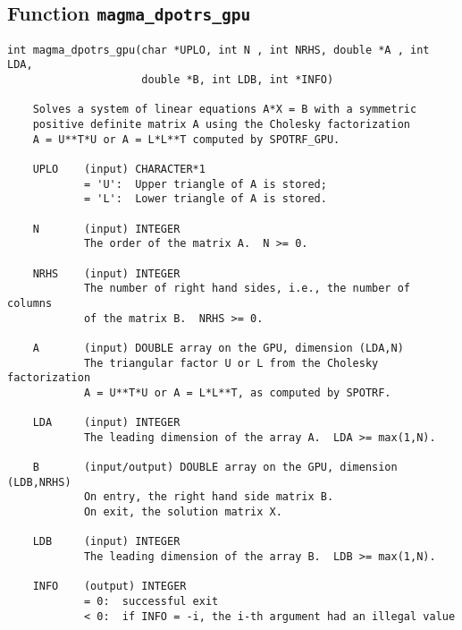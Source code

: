 \documentclass[10pt]{book}
\begin{document}
\newpage
\subsection{Function {\tt {\bf magma\_dpotrs\_gpu}}}
\begin{verbatim}
int magma_dpotrs_gpu(char *UPLO, int N , int NRHS, double *A , int LDA,
                     double *B, int LDB, int *INFO)

    Solves a system of linear equations A*X = B with a symmetric
    positive definite matrix A using the Cholesky factorization
    A = U**T*U or A = L*L**T computed by SPOTRF_GPU.

    UPLO    (input) CHARACTER*1
            = 'U':  Upper triangle of A is stored;
            = 'L':  Lower triangle of A is stored.

    N       (input) INTEGER
            The order of the matrix A.  N >= 0.

    NRHS    (input) INTEGER
            The number of right hand sides, i.e., the number of columns
            of the matrix B.  NRHS >= 0.

    A       (input) DOUBLE array on the GPU, dimension (LDA,N)
            The triangular factor U or L from the Cholesky factorization
            A = U**T*U or A = L*L**T, as computed by SPOTRF.

    LDA     (input) INTEGER
            The leading dimension of the array A.  LDA >= max(1,N).

    B       (input/output) DOUBLE array on the GPU, dimension (LDB,NRHS)
            On entry, the right hand side matrix B.
            On exit, the solution matrix X.

    LDB     (input) INTEGER
            The leading dimension of the array B.  LDB >= max(1,N).

    INFO    (output) INTEGER
            = 0:  successful exit
            < 0:  if INFO = -i, the i-th argument had an illegal value
\end{verbatim}


\newpage
\end{document}
